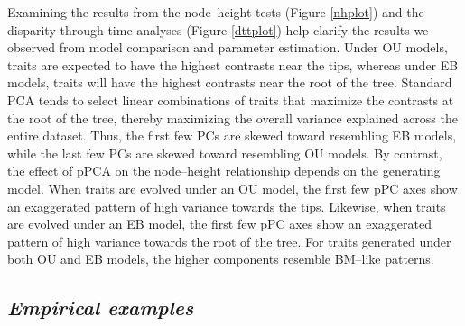 \documentclass[a4paper,12pt]{article}
\begin{document}
Examining the results from the node--height tests (Figure \ref{nhplot}) and the disparity through time analyses (Figure \ref{dttplot}) help clarify the results we observed from model comparison and parameter estimation. 
Under OU models, traits are expected to have the highest contrasts near the tips, whereas under EB models, traits will have the highest contrasts near the root of the tree. Standard PCA tends to select linear combinations of traits that maximize the contrasts at the root of the tree, thereby maximizing the overall variance explained across the entire dataset. Thus, the first few PCs are skewed toward resembling EB models, while the last few PCs are skewed toward resembling OU models. By contrast, the effect of pPCA on the node--height relationship depends on the generating model. When traits are evolved under an OU model, the first few pPC axes show an exaggerated pattern of high variance towards the tips. Likewise, when traits are evolved under an EB model, the first few pPC axes show an exaggerated pattern of high variance towards the root of the tree. For traits generated under both OU and EB models, the higher components resemble BM--like patterns. 

\subsection{\emph{Empirical examples}}
\end{document}
